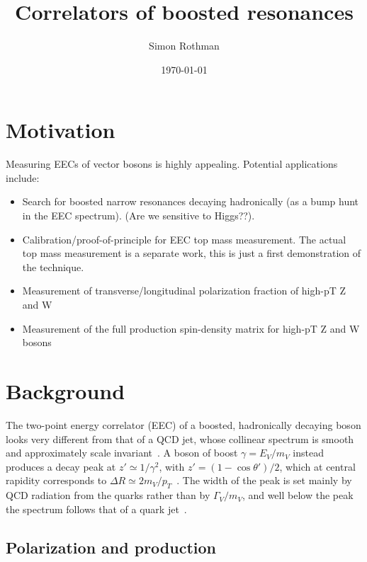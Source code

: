 \documentclass[11pt]{article}
\title{Correlators of boosted resonances}
\author{Simon Rothman}
\date{\today}
\begin{document}
\maketitle

\tableofcontents

\section{Motivation}

Measuring EECs of vector bosons is highly appealing.
Potential applications include:
\begin{itemize}
    \item Search for boosted narrow resonances decaying hadronically (as a bump hunt in the EEC spectrum). (Are we sensitive to Higgs??).
    \item Calibration/proof-of-principle for EEC top mass measurement. The actual top mass measurement is a separate work, this is just a first demonstration of the technique. 
    \item Measurement of transverse/longitudinal polarization fraction of high-pT Z and W
    \item Measurement of the full production spin-density matrix for high-pT Z and W bosons
\end{itemize}

\section{Background}

The two-point energy correlator (EEC) of a boosted, hadronically decaying boson looks very different from that of a QCD jet, whose collinear spectrum is smooth and approximately scale invariant~\cite{Gao:2026hoj}.
A boson of boost \(\gamma = E_V/m_V\) instead produces a decay peak at \(z' \simeq 1/\gamma^2\), with \(z' = (1-\cos\theta')/2\), which at central rapidity corresponds to \(\Delta R \simeq 2m_V/p_T\)~\cite{Gao:2026hoj}.
The width of the peak is set mainly by QCD radiation from the quarks rather than by \(\Gamma_V/m_V\), and well below the peak the spectrum follows that of a quark jet~\cite{Ricci:2022htc}.

\subsection{Polarization and production}
\end{document}
